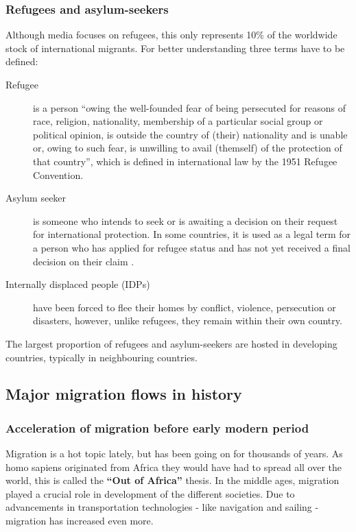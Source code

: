 \documentclass[../summary.tex]{subfiles}
\begin{document}
\subsubsection{Refugees and asylum-seekers}
Although media focuses on refugees, this only represents 10\% of the worldwide stock of international migrants. For better understanding three terms have to be defined:
\begin{description}
	\item[Refugee] is a person ``owing the well-founded fear of being persecuted for reasons of race, religion, nationality, membership of a particular social group or political opinion, is outside the country of (their) nationality and is unable or, owing to such fear, is unwilling to avail (themself) of the protection of that country'', which is defined in international law by the 1951 Refugee Convention.
	\item[Asylum seeker] is someone who intends to seek or is awaiting a decision on their request for international protection. In some countries, it is used as a legal term for a person who has applied for refugee status and has not yet received a final decision on their claim .
	\item[Internally displaced people (IDPs)] have been forced to flee their homes by conflict, violence, persecution or disasters, however, unlike refugees, they remain within their own country.
\end{description}
The largest proportion of refugees and asylum-seekers are hosted in developing countries, typically in neighbouring countries.


\subsection{Major migration flows in history}
\subsubsection{Acceleration of migration before early modern period}
Migration is a hot topic lately, but has been going on for thousands of years. As homo sapiens originated from Africa they would have had to spread all over the world, this is called the \textbf{``Out of Africa''} thesis. In the middle ages, migration played a crucial role in development of the different societies. Due to advancements in transportation technologies - like navigation and sailing - migration has increased even more.
\end{document}
